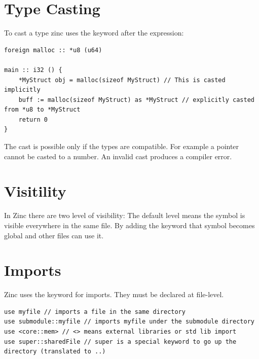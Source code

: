 \section{Type Casting}

To cast a type zinc uses the  keyword after the expression:
\begin{lstlisting}[style=zinc, caption={Type casting}]
foreign malloc :: *u8 (u64)

main :: i32 () {
    *MyStruct obj = malloc(sizeof MyStruct) // This is casted implicitly
    buff := malloc(sizeof MyStruct) as *MyStruct // explicitly casted from *u8 to *MyStruct
    return 0
}
\end{lstlisting}
The cast is possible only if the types are compatible.
For example a pointer cannot be casted to a number. An invalid cast produces a compiler error.

\section{Visitility}

In Zinc there are two level of visibility:
The default level means the symbol is visible everywhere in the same file.
By adding the  keyword that symbol becomes global and other files can use it.

\section{Imports}
Zinc uses the  keyword for imports. They must be declared at file-level.

\begin{lstlisting}[style=zinc, caption={Imports}]
use myfile // imports a file in the same directory
use submodule::myfile // imports myfile under the submodule directory
use <core::mem> // <> means external libraries or std lib import
use super::sharedFile // super is a special keyword to go up the directory (translated to ..)
\end{lstlisting}


